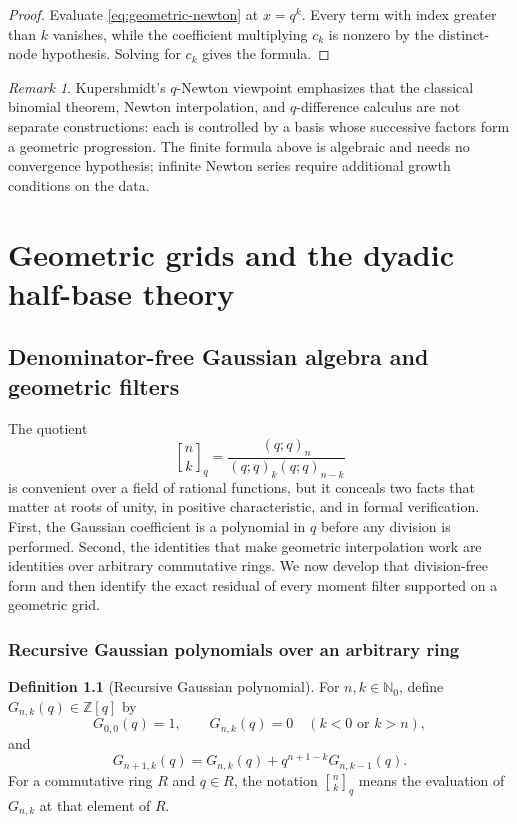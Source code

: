 \documentclass[11pt,oneside,openany]{book}
\theoremstyle{definition}
\newtheorem{definition}[theorem]{Definition}
\theoremstyle{remark}
\newtheorem{remark}[theorem]{Remark}
\newcommand{\Qbinom}[3]{\genfrac{[}{]}{0pt}{}{#1}{#2}_{#3}}
\newcommand{\Z}{\mathbb Z}
\newcommand{\N}{\mathbb N}
\begin{document}
\begin{proof}
Evaluate \eqref{eq:geometric-newton} at $x=q^k$.  Every term with index greater than $k$ vanishes, while the coefficient multiplying $c_k$ is nonzero by the distinct-node hypothesis.  Solving for $c_k$ gives the formula.
\end{proof}

\begin{remark}
Kupershmidt's $q$-Newton viewpoint emphasizes that the classical binomial theorem, Newton interpolation, and $q$-difference calculus are not separate constructions: each is controlled by a basis whose successive factors form a geometric progression.  The finite formula above is algebraic and needs no convergence hypothesis; infinite Newton series require additional growth conditions on the data.
\end{remark}

\part{Geometric grids and the dyadic half-base theory}

\chapter{Denominator-free Gaussian algebra and geometric filters}
\label{chap:denominator-free-geometric}

The quotient
\[
 \Qbinom nkq=\frac{(q;q)_n}{(q;q)_k(q;q)_{n-k}}
\]
is convenient over a field of rational functions, but it conceals two facts
that matter at roots of unity, in positive characteristic, and in formal
verification.  First, the Gaussian coefficient is a polynomial in $q$ before
any division is performed.  Second, the identities that make geometric
interpolation work are identities over arbitrary commutative rings.  We now
develop that division-free form and then identify the exact residual of every
moment filter supported on a geometric grid.

\section{Recursive Gaussian polynomials over an arbitrary ring}

\begin{definition}[Recursive Gaussian polynomial]
For $n,k\in\N_0$, define $G_{n,k}(q)\in\Z[q]$ by
\[
 G_{0,0}(q)=1,
 \qquad
 G_{n,k}(q)=0\quad(k<0\text{ or }k>n),
\]
and
\begin{equation}
 G_{n+1,k}(q)=G_{n,k}(q)+q^{n+1-k}G_{n,k-1}(q).
 \label{eq:df-recursive-gaussian}
\end{equation}
For a commutative ring $R$ and $q\in R$, the notation
$\Qbinom nkq$ means the evaluation of $G_{n,k}$ at that element of $R$.
\end{definition}
\end{document}
